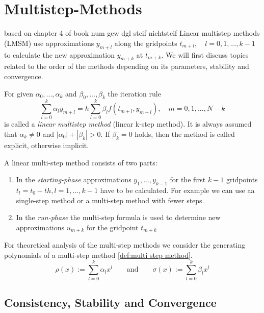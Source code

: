 			
\section{Multistep-Methods}
	based on chapter 4 of book num gew dgl steif nichtsteif \newline
	Linear multistep methods (LMSM) use approximations $y_{m+l}$ along the gridpoints $t_{m+l}, \quad l=0,1,...,k-1$ to calculate the new approximation $y_{m+k}$ at $t_{m+k}$. We will first discuss topics related to the order of the methods depending on its parameters, stability and convergence.
	
	\begin{definition}
		\label{def:multi step method}
		For given $\alpha_0, ..., \alpha_k$ and $\beta_0, ..., \beta_k$ the iteration rule
		\begin{equation}
			\label{linear-multistep-method}
			\sum_{l=0}^{k} \alpha_l y_{m+l} = h \sum_{l=0}^{k} \beta_l f(t_{m+l}, y_{m+l}), \quad m=0,1,...,N-k
		\end{equation}
		is called a \emph{linear multistep method} (linear k-step method). It is always assumed that $\alpha_k \neq 0$ and $|\alpha_0| + |\beta_k| > 0$. If $\beta_k=0$ holds, then the method is called explicit, otherwise implicit.
	\end{definition}
	
	A linear multi-step method consists of two parts:
	\begin{enumerate}
		\item In the \emph{starting-phase} approximations $y_1,...,y_{k-1}$ for the first $k-1$ gridpoints $t_l = t_0+th, l=1,...,k-1$ have to be calculated. For example we can use aa single-step method or a multi-step method with fewer steps.
		
		\item  In the \emph{run-phase} the multi-step formula is used to determine new approximations $u_{m+k}$ for the gridpoint $t_{m+k}$
	\end{enumerate}
	
	For theoretical analysis of the multi-step methods we consider the generating polynomials of a multi-step method \ref{def:multi step method}.
	\begin{equation}
		\label{eq:generating polynomials multistep method}
		\rho(x) := \sum_{l=0}^{k} \alpha_l x^l
		\qquad \text{and} \qquad
		\sigma(x) := \sum_{l=0}^{k} \beta_l x^l
	\end{equation}
			
	
	\subsection{Consistency, Stability and Convergence}
	\cite{NumerikGewöhnlicherDifferentialgleichungen}
	

